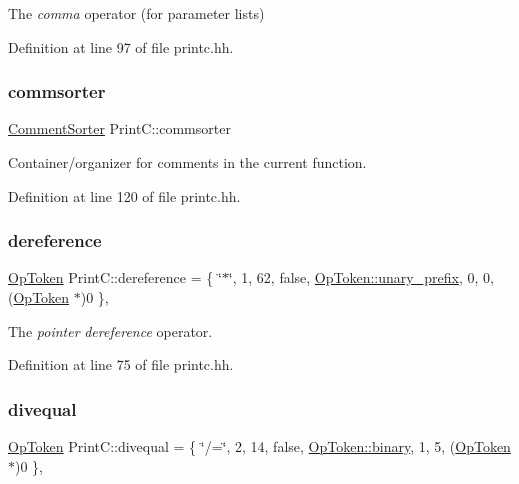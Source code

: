 The {\itshape comma} operator (for parameter lists) 



Definition at line 97 of file printc.\+hh.

\mbox{\label{class_print_c_a3092383bb59a303a37820b33ddc02183}} 
\subsubsection{\texorpdfstring{commsorter}{commsorter}}
{\footnotesize\ttfamily \mbox{\hyperlink{class_comment_sorter}{Comment\+Sorter}} Print\+C\+::commsorter\hspace{0.3cm}{\ttfamily [protected]}}



Container/organizer for comments in the current function. 



Definition at line 120 of file printc.\+hh.

\mbox{\label{class_print_c_a7d63db28ddbeb25416eeb5b5abffdf13}} 
\subsubsection{\texorpdfstring{dereference}{dereference}}
{\footnotesize\ttfamily \mbox{\hyperlink{class_op_token}{Op\+Token}} Print\+C\+::dereference = \{ \char`\"{}$\ast$\char`\"{}, 1, 62, false, \mbox{\hyperlink{class_op_token_af41c7f108d5662ede7765c5a6c44eaffa0d809c13f66611247b81856fc9e68289}{Op\+Token\+::unary\+\_\+prefix}}, 0, 0, (\mbox{\hyperlink{class_op_token}{Op\+Token}} $\ast$)0 \}\hspace{0.3cm}{\ttfamily [static]}, {\ttfamily [protected]}}



The {\itshape pointer} {\itshape dereference} operator. 



Definition at line 75 of file printc.\+hh.

\mbox{\label{class_print_c_a4a6ff1f6d6449a198b2cecfe4bf4f925}} 
\subsubsection{\texorpdfstring{divequal}{divequal}}
{\footnotesize\ttfamily \mbox{\hyperlink{class_op_token}{Op\+Token}} Print\+C\+::divequal = \{ \char`\"{}/=\char`\"{}, 2, 14, false, \mbox{\hyperlink{class_op_token_af41c7f108d5662ede7765c5a6c44eaffa3a2ec63522a9329a71ddbe8adc3e752d}{Op\+Token\+::binary}}, 1, 5, (\mbox{\hyperlink{class_op_token}{Op\+Token}} $\ast$)0 \}\hspace{0.3cm}{\ttfamily [static]}, {\ttfamily [protected]}}



